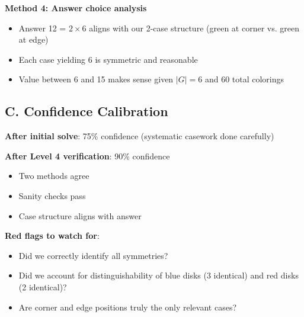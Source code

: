 \documentclass[11pt]{article}
\begin{document}
\begin{verificationbox}
\textbf{Method 4: Answer choice analysis}
\begin{itemize}
    \item Answer 12 = $2 \times 6$ aligns with our 2-case structure (green at corner vs. green at edge)
    \item Each case yielding 6 is symmetric and reasonable
    \item Value between 6 and 15 makes sense given $|G| = 6$ and 60 total colorings
\end{itemize}

\subsection*{C. Confidence Calibration}

\textbf{After initial solve}: 75\% confidence (systematic casework done carefully)

\textbf{After Level 4 verification}: 90\% confidence
\begin{itemize}
    \item Two methods agree
    \item Sanity checks pass
    \item Case structure aligns with answer
\end{itemize}

\textbf{Red flags to watch for}:
\begin{itemize}
    \item Did we correctly identify all symmetries?
    \item Did we account for distinguishability of blue disks (3 identical) and red disks (2 identical)?
    \item Are corner and edge positions truly the only relevant cases?
\end{itemize}
\end{verificationbox}
\end{document}
